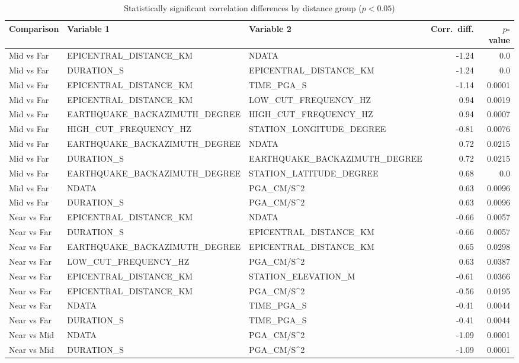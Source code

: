 \begin{table}[H]
\centering
\caption{Statistically significant correlation differences by distance group ($p < 0.05$)}
\label{tab:corr_diff}
\begin{tabular}{lllrr}
\toprule
Comparison & Variable 1 & Variable 2 & Corr.\ diff. & $p$-value \\
\midrule
Mid vs Far & EPICENTRAL_DISTANCE_KM & NDATA & -1.24 & 0.0 \\
Mid vs Far & DURATION_S & EPICENTRAL_DISTANCE_KM & -1.24 & 0.0 \\
Mid vs Far & EPICENTRAL_DISTANCE_KM & TIME_PGA_S & -1.14 & 0.0001 \\
Mid vs Far & EPICENTRAL_DISTANCE_KM & LOW_CUT_FREQUENCY_HZ & 0.94 & 0.0019 \\
Mid vs Far & EARTHQUAKE_BACKAZIMUTH_DEGREE & HIGH_CUT_FREQUENCY_HZ & 0.94 & 0.0007 \\
Mid vs Far & HIGH_CUT_FREQUENCY_HZ & STATION_LONGITUDE_DEGREE & -0.81 & 0.0076 \\
Mid vs Far & EARTHQUAKE_BACKAZIMUTH_DEGREE & NDATA & 0.72 & 0.0215 \\
Mid vs Far & DURATION_S & EARTHQUAKE_BACKAZIMUTH_DEGREE & 0.72 & 0.0215 \\
Mid vs Far & EARTHQUAKE_BACKAZIMUTH_DEGREE & STATION_LATITUDE_DEGREE & 0.68 & 0.0 \\
Mid vs Far & NDATA & PGA_CM/S^2 & 0.63 & 0.0096 \\
Mid vs Far & DURATION_S & PGA_CM/S^2 & 0.63 & 0.0096 \\
Near vs Far & EPICENTRAL_DISTANCE_KM & NDATA & -0.66 & 0.0057 \\
Near vs Far & DURATION_S & EPICENTRAL_DISTANCE_KM & -0.66 & 0.0057 \\
Near vs Far & EARTHQUAKE_BACKAZIMUTH_DEGREE & EPICENTRAL_DISTANCE_KM & 0.65 & 0.0298 \\
Near vs Far & LOW_CUT_FREQUENCY_HZ & PGA_CM/S^2 & 0.63 & 0.0387 \\
Near vs Far & EPICENTRAL_DISTANCE_KM & STATION_ELEVATION_M & -0.61 & 0.0366 \\
Near vs Far & EPICENTRAL_DISTANCE_KM & PGA_CM/S^2 & -0.56 & 0.0195 \\
Near vs Far & NDATA & TIME_PGA_S & -0.41 & 0.0044 \\
Near vs Far & DURATION_S & TIME_PGA_S & -0.41 & 0.0044 \\
Near vs Mid & NDATA & PGA_CM/S^2 & -1.09 & 0.0001 \\
Near vs Mid & DURATION_S & PGA_CM/S^2 & -1.09 & 0.0001 \\

\end{tabular}
\end{table}
